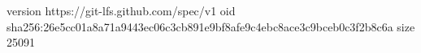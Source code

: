 version https://git-lfs.github.com/spec/v1
oid sha256:26e5cc01a8a71a9443ec06c3cb891e9bf8afe9c4ebc8ace3c9bceb0c3f2b8c6a
size 25091
